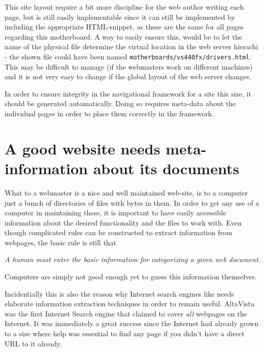This site layout require a bit more discipline for the web author
writing each page, but is still easily implementable since it can
still be implemented by including the appropriate HTML-snippet, as
these are the same for all pages regarding this motherboard.  A way to
easily ensure this, would be to let the name of the physical file
determine the virtual location in the web server hierachi - the shown
file could have been named
\texttt{motherboards/vs440fx/drivers.html}.  This may be difficult to
manage (if the webmasters work on different machines) and it is not
very easy to change if the global layout of the web server changes.

In order to ensure integrity in the navigational framework for a site
this size, it should be generated automatically.  Doing so requires
meta-data about the individual pages in order to place them correctly
in the framework.

\section{A good website needs meta-information about its documents}

What to a webmaster is a nice and well maintained web-site, is to a
computer just a bunch of directories of files with bytes in them.  In
order to get any use of a computer in maintaining these, it is
important to have easily accessible information about the desired
functionality and the files to work with.  Even though complicated
rules can be constructed to extract information from webpages, the
basic rule is still that

\begin{center}
  \textit{A human must enter the basic
  information for categorizing a given web document}.
\end{center}

Computers are simply not good enough yet to guess this information
themselves.

Incidentially this is also the reason why Internet search engines like
 needs elaborate
information extraction techniques in order to remain useful.
AltaVista was the first Internet Search engine that claimed to cover
\textit{all} webpages on the Internet.  It was immediately a great
success since the Internet had already grown to a size where help was
essential to find any page if you didn't have a direct URL to it
already.

